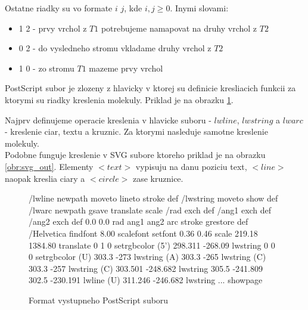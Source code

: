 Ostatne riadky su vo formate $i$ $j$, kde $i, j \ge 0$. Inymi slovami:
\begin{itemize}
  \item 1 2 - prvy vrchol z $T1$ potrebujeme namapovat na druhy vrchol z $T2$
  \item 0 2 - do vysledneho stromu vkladame druhy vrchol z $T2$
  \item 1 0 - zo stromu $T1$ mazeme prvy vrchol
\end{itemize}

PostScript subor je zlozeny z hlavicky v ktorej su definicie kresliacich funkcii za
ktorymi su riadky kreslenia molekuly. Priklad je na obrazku \ref{obr:ps_out}.

Najprv definujeme operacie kreslenia v hlavicke suboru - $lwline$, $lwstring$ a $lwarc$ - kreslenie ciar,
textu a kruznic. Za ktorymi nasleduje samotne kreslenie molekuly. \\

Podobne funguje kreslenie v SVG subore ktoreho priklad je na obrazku \ref{obr:svg_out}.
Elementy $<text>$ vypisuju na danu poziciu text, $<line>$
naopak kreslia ciary a $<circle>$ zase kruznice.

\begin{figure}
\begin{code}[fontsize=\scriptsize, frame=none, samepage=true]
/lwline {newpath moveto lineto stroke} def
/lwstring {moveto show} def
/lwarc {newpath gsave translate scale /rad exch def /ang1 exch def /ang2 exch def 0.0 0.0
  rad ang1 ang2 arc stroke grestore} def
/Helvetica findfont 8.00 scalefont setfont
0.36 0.46 scale
219.18 1384.80 translate
0              1              0               setrgbcolor
(5')            298.311        -268.09         lwstring
0              0              0               setrgbcolor
(U)             303.3          -273            lwstring
(A)             303.3          -265            lwstring
(C)             303.3          -257            lwstring
(C)             303.501        -248.682        lwstring
305.5          -241.809       302.5          -230.191        lwline
(U)             311.246        -246.682        lwstring
  ...
showpage
\end{code}
\caption{Format vystupneho PostScript suboru}
\label{obr:ps_out}
\end{figure}


